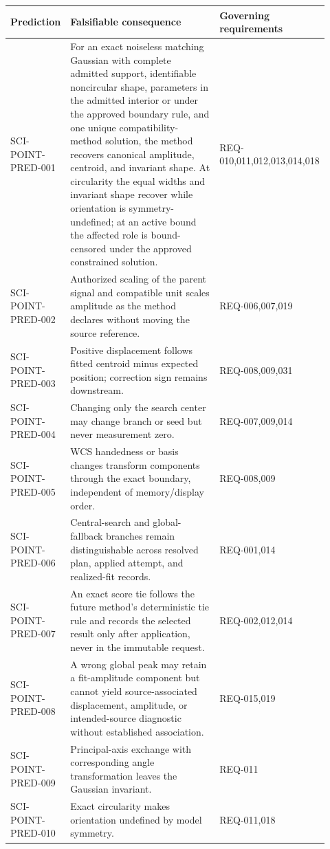 \scriptsize
\begin{longtable}{@{}p{0.16\linewidth}p{0.58\linewidth}p{0.18\linewidth}@{}}
\toprule
Prediction & Falsifiable consequence & Governing requirements \\
\midrule
\endhead
SCI-POINT-PRED-001 & For an exact noiseless matching Gaussian with complete admitted support, identifiable noncircular shape, parameters in the admitted interior or under the approved boundary rule, and one unique compatibility-method solution, the method recovers canonical amplitude, centroid, and invariant shape. At circularity the equal widths and invariant shape recover while orientation is symmetry-undefined; at an active bound the affected role is bound-censored under the approved constrained solution. & REQ-010,011,012,013,014,018 \\
SCI-POINT-PRED-002 & Authorized scaling of the parent signal and compatible unit scales amplitude as the method declares without moving the source reference. & REQ-006,007,019 \\
SCI-POINT-PRED-003 & Positive displacement follows fitted centroid minus expected position; correction sign remains downstream. & REQ-008,009,031 \\
SCI-POINT-PRED-004 & Changing only the search center may change branch or seed but never measurement zero. & REQ-007,009,014 \\
SCI-POINT-PRED-005 & WCS handedness or basis changes transform components through the exact boundary, independent of memory/display order. & REQ-008,009 \\
SCI-POINT-PRED-006 & Central-search and global-fallback branches remain distinguishable across resolved plan, applied attempt, and realized-fit records. & REQ-001,014 \\
SCI-POINT-PRED-007 & An exact score tie follows the future method's deterministic tie rule and records the selected result only after application, never in the immutable request. & REQ-002,012,014 \\
SCI-POINT-PRED-008 & A wrong global peak may retain a fit-amplitude component but cannot yield source-associated displacement, amplitude, or intended-source diagnostic without established association. & REQ-015,019 \\
SCI-POINT-PRED-009 & Principal-axis exchange with corresponding angle transformation leaves the Gaussian invariant. & REQ-011 \\
SCI-POINT-PRED-010 & Exact circularity makes orientation undefined by model symmetry. & REQ-011,018 \\

\end{longtable}
